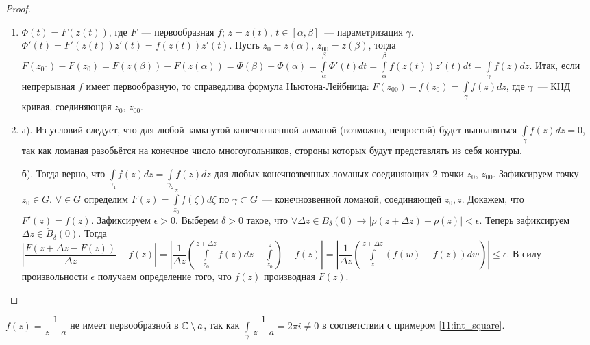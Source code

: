 \begin{proof}
    \begin{enumerate}[wide=5pt, label=\arabic*., itemsep=0ex]
        \item \(\Phi(t) = F(z(t))\), где \(F\)~--- первообразная \(f\); \(z = z(t)\), \(t \in 
        [\alpha, \beta]\)~--- параметризация \(\gamma\). \(\Phi'(t) = F'(z(t))z'(t) = f(z(t))
        z'(t)\). Пусть \(z_0 = z(\alpha), \, z_{00} = z(\beta)\), тогда \(F(z_{00}) - F(z_0) = 
        F(z(\beta)) - F(z(\alpha)) = \Phi(\beta) - \Phi(\alpha) = \int\limits_\alpha^\beta \Phi'(t)
        dt = \int\limits_\alpha^\beta f(z(t))z'(t)dt = \int\limits_\gamma f(z)dz\). Итак, если 
        непрерывная \(f\) имеет первообразную, то справедлива формула Ньютона-Лейбница:
        \(F(z_{00}) - f(z_0) = \int\limits_\gamma f(z)dz\), где \(\gamma\)~--- КНД кривая, 
        соединяющая \(z_0, \, z_{00}\).

        \item а). Из условий следует, что для любой замкнутой конечнозвенной ломаной (возможно, 
        непростой) будет выполняться \(\int\limits_\gamma f(z)dz = 0\), так как ломаная разобьётся
        на конечное число многоугольников, стороны которых будут представлять из себя контуры.

        б). Тогда верно, что \(\int\limits_{\gamma_1} f(z)dz = \int\limits_{\gamma_2} f(z)dz\) для 
        любых конечнозвенных ломаных соединяющих 2 точки \(z_0, \, z_{00}\). Зафиксируем точку
        \(z_0 \in G\). \(\forall \in G\) определим \(F(z) = \int\limits_{z_0}^{z} f(\zeta) d\zeta\)
        по \(\gamma \subset G\)~--- конечнозвенной ломаной, соединяющей \(z_0, z\). Докажем, что \(
        F'(z) = f(z)\). Зафиксируем \(\epsilon > 0\). Выберем \(\delta > 0\) такое, что \(\forall
        \Delta z \in B_\delta (0) \rightarrow |\rho(z+\Delta z) - \rho(z)| < \epsilon\). Теперь
        зафиксируем \(\Delta z \in \mathring{B}_\delta (0)\). Тогда \(|\dfrac{F(z+\Delta z - F(z))}
        {\Delta z} - f(z)| = |\dfrac{1}{\Delta z}(\int\limits_{z_0}^{z+\Delta z} f(z)dz - 
        \int\limits_{z_0}^{z}) - f(z)| = |\dfrac{1}{\Delta z}(\int\limits_{z}^{z+\Delta z} (f(w) - 
        f(z))dw)| \le \epsilon\). В силу произвольности \(\epsilon\) получаем определение того, что
        \(f(z)\) производная \(F(z)\).
    \end{enumerate}
\end{proof}

\begin{example}
    \(f(z) = \dfrac{1}{z-a}\) не имеет первообразной в \(\mathbb{C} \setminus {a}\), так как \(
    \int\limits_\gamma \dfrac{1}{z-a} = 2\pi i \ne 0\) в соответствии с примером 
    \ref{11:int_square}.
\end{example}


